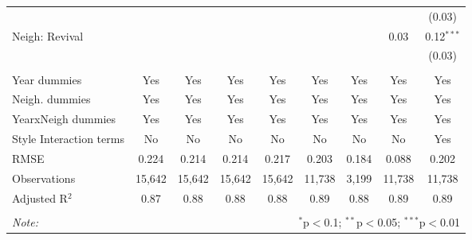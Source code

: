 \begin{table}[!htbp]
\begin{tabular}{@{\extracolsep{5pt}}lcccccccc}
  &  &  &  &  &  &  &  & (0.03) \\ 
  Neigh: Revival &  &  &  &  &  &  & 0.03 & 0.12$^{***}$ \\ 
  &  &  &  &  &  &  &  & (0.03) \\ 
 \hline \\[-1.8ex] 
Year dummies & Yes & Yes & Yes & Yes & Yes & Yes & Yes & Yes \\ 
Neigh. dummies & Yes & Yes & Yes & Yes & Yes & Yes & Yes & Yes \\ 
YearxNeigh dummies & Yes & Yes & Yes & Yes & Yes & Yes & Yes & Yes \\ 
Style Interaction terms & No & No & No & No & No & No & No & Yes \\ 
RMSE & 0.224 & 0.214 & 0.214 & 0.217 & 0.203 & 0.184 & 0.088 & 0.202 \\ 
Observations & 15,642 & 15,642 & 15,642 & 15,642 & 11,738 & 3,199 & 11,738 & 11,738 \\ 
Adjusted R$^{2}$ & 0.87 & 0.88 & 0.88 & 0.88 & 0.89 & 0.88 & 0.89 & 0.89 \\ 
\hline 
\hline \\[-1.8ex] 
\textit{Note:}  & \multicolumn{8}{r}{$^{*}$p$<$0.1; $^{**}$p$<$0.05; $^{***}$p$<$0.01} \\ 
\end{tabular} 
\end{table} 
